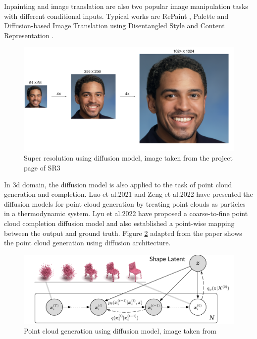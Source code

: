 \documentclass[12pt,DIV14,BCOR12mm,a4paper,footinclude=false,headinclude,parskip=half-,twoside,openright,cleardoublepage=empty,toc=index,bibliography=totoc,listof=totoc]{scrreprt}
\numberwithin{equation}{chapter}
\begin{document}
Inpainting and image translation are also two popular image manipulation tasks with different conditional inputs. Typical works are RePaint \cite{lugmayr2022repaint}, Palette \cite{saharia2022palette} and Diffusion-based Image Translation using Disentangled Style and Content Representation \cite{kwon2023diffusionbased}.
\begin{figure}[h]
	\centering
	\includegraphics[scale=.08]{img/cascade_fig.png}
	\caption{Super resolution using diffusion model, image taken from the project page of SR3 \cite{saharia2021image}}
	\label{img:sr3}
\end{figure}


In \gls{3d} domain, the diffusion model is also applied to the task of point cloud generation and completion. Luo et al.2021 \cite{luo2021diffusion} and Zeng et al.2022 \cite{zeng2022lion} have presented the diffusion models for point cloud generation by treating point clouds as particles in a thermodynamic system. Lyu et al.2022 \cite{lyu2022conditional} have proposed a coarse-to-fine point cloud completion diffusion model and also established a point-wise mapping between the output and ground truth. Figure \ref{img:pcd} adapted from the paper shows the point cloud generation using diffusion architecture.

\begin{figure}[h]
	\centering
	\includegraphics[scale=1.8]{img/teaser.png}
	\caption{Point cloud generation using diffusion model, image taken from \cite{lyu2022conditional}}
	\label{img:pcd}
\end{figure}
\end{document}
